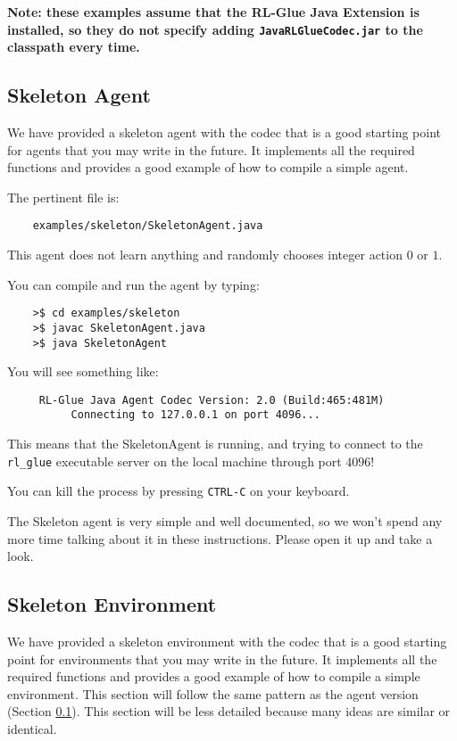 \documentclass[11pt]{article}
\begin{document}
\textbf{Note: these examples assume that the RL-Glue Java Extension is installed, so they do not specify adding \texttt{JavaRLGlueCodec.jar} to the classpath every time.}

\subsection{Skeleton Agent}
\label{sec:agent}
We have provided a skeleton agent with the codec that is a good starting point for agents that you may write in the future.
It implements all the required functions and provides a good example of how to compile a simple agent.

The pertinent file is:
\begin{verbatim}
	examples/skeleton/SkeletonAgent.java
\end{verbatim}

This agent does not learn anything and randomly chooses integer action $0$ or $1$.  

You can compile and run the agent by typing:
\begin{verbatim}
	>$ cd examples/skeleton
	>$ javac SkeletonAgent.java
	>$ java SkeletonAgent
\end{verbatim}

You will see something like:
\begin{verbatim}
     RL-Glue Java Agent Codec Version: 2.0 (Build:465:481M)
          Connecting to 127.0.0.1 on port 4096...
\end{verbatim}

This means that the SkeletonAgent is running, and trying to connect to the \texttt{rl\_glue} executable server on the local machine through port $4096$! 

You can kill the process by pressing \texttt{CTRL-C} on your keyboard.

The Skeleton agent is very simple and well documented, so we won't spend any more time talking about it in these instructions.
Please open it up and take a look.

\subsection{Skeleton Environment}
\label{sec:env}
We have provided a skeleton environment with the codec that is a good starting point for environments that you may write in the future.
It implements all the required functions and provides a good example of how to compile a simple environment.  This section will follow the same 
pattern as the agent version (Section \ref{sec:agent}).  This section will be less detailed because many ideas are similar or identical.
\end{document}
